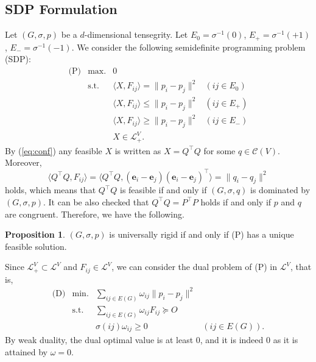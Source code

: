 \documentclass[11pt]{article}
\theoremstyle{definition}
\newtheorem{prop}[defi]{Proposition}
\begin{document}
\subsection{SDP Formulation}
Let $(G,\sigma, p)$ be a $d$-dimensional tensegrity.  
Let $E_0=\sigma^{-1}(0)$, $E_+=\sigma^{-1}(+1)$, $E_-=\sigma^{-1}(-1)$.
We consider the following semidefinite programming problem (SDP):
    \[
\begin{array}{llll}
        \text{(P)} &  \text{max.}  & 0 \\
         & \text{s.t.}  & \langle X, F_{ij} \rangle   =  \| p_i-p_j\|^2 &(ij \in E_0) \\
         &              & \langle X, F_{ij} \rangle \leq \| p_i-p_j\|^2 &(ij \in E_+) \\
         &              & \langle X, F_{ij} \rangle \geq \| p_i-p_j\|^2 &(ij \in E_-) \\
         &              & X \in \mathcal{L}^V_+.
    \end{array}
\]
By (\ref{eq:conf}) any feasible $X$ is written as $X=Q^{\top}Q$ for some $q\in \mathcal{C}(V)$.     
Moreover, 
\[
\langle Q^\top Q, F_{ij}\rangle=\langle Q^\top Q, (\bm{e}_i-\bm{e}_j)(\bm{e}_i-\bm{e}_j)^\top \rangle = \|q_i-q_j\|^2
\]
holds, which means that $Q^\top Q$ is feasible if and only if 
    $(G,\sigma,q)$ is dominated by $(G,\sigma,p)$.
It can be also checked that $Q^\top Q=P^{\top} P$ holds if and only if $p$ and $q$ are congruent.
    Therefore, we have the following.
    \begin{prop} \label{prop:uniqueness}
        $(G,\sigma,p)$ is universally rigid if and only if (P) has a unique feasible solution.
    \end{prop}
Since $\mathcal{L}^V_+\subset \mathcal{L}^V$ and $F_{ij}\in \mathcal{L}^V$, we can consider the dual problem of (P) in $\mathcal{L}^V$, that is, 
\[
    \begin{array}{llll}
        \text{(D)} & \text{min.}  & \sum_{ij \in E(G)} \omega_{ij}\|p_i-p_j\|^2 \\
         & \text{s.t.}  & \sum_{ij \in E(G)} \omega_{ij} F_{ij} \succeq O \\
         &   & \sigma(ij)\omega_{ij} \geq 0 & (ij\in E(G)).
    \end{array}
\]
By weak duality, the dual optimal value is at least $0$, and it is indeed $0$ as it is attained by $\omega=0$.
\end{document}
